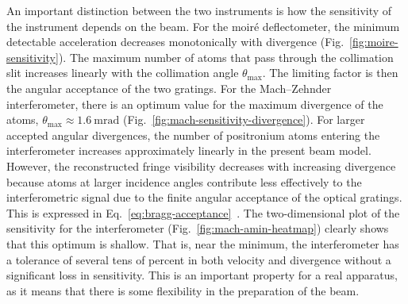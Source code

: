 \documentclass[12pt]{report}
\begin{document}
An important distinction between the two instruments is how the sensitivity of the instrument depends on the beam. For the moir\'e deflectometer, the minimum detectable acceleration decreases monotonically with divergence (Fig.~\ref{fig:moire-sensitivity}). The maximum number of atoms that pass through the collimation slit increases linearly with the collimation angle $\theta_{\max}$. The limiting factor is then the angular acceptance of the two gratings. For the Mach--Zehnder interferometer, there is an optimum value for the maximum divergence of the atoms, $\theta_{\max} \approx 1.6~\mathrm{mrad}$ (Fig.~\ref{fig:mach-sensitivity-divergence}). 
For larger accepted angular divergences, the number of positronium atoms entering the interferometer increases approximately linearly in the present beam model. However, the reconstructed fringe visibility decreases with increasing divergence because atoms at larger incidence angles contribute less effectively to the interferometric signal due to the finite angular acceptance of the optical gratings.
This is expressed in Eq.~\eqref{eq:bragg-acceptance}~\cite{Dürr_Rempe_1999}. The two-dimensional plot of the sensitivity for the interferometer (Fig.~\ref{fig:mach-amin-heatmap}) clearly shows that this optimum is shallow. That is, near the minimum, the interferometer has a tolerance of several tens of percent in both velocity and divergence without a significant loss in sensitivity. This is an important property for a real apparatus, as it means that there is some flexibility in the preparation of the beam.
\end{document}
